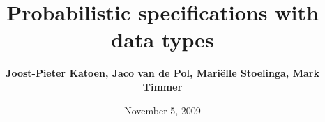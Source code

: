 \documentclass{beamer}
\title[]{\Huge Probabilistic specifications with data types}
\author[]{\LARGE \textbf{Joost-Pieter Katoen, Jaco van de Pol, Mari\"elle Stoelinga, Mark Timmer}}
\institute{\Large \vfill {Formal Methods and Tools -- Department of Computer Science -- University of Twente} }
\date{November 5, 2009}
\begin{document}
  \begin{frame}{}

\vspace{-1cm}
\begin{columns}[t]
\begin{column}{.02\linewidth}\end{column}
\begin{column}{.97\linewidth}\end{column}
\begin{column}{.02\linewidth}\end{column}
\end{columns}

\linewidth

\begin{columns}[t]
\begin{column}{.02\linewidth}\end{column}
\begin{column}{.475\linewidth}\end{column}
\begin{column}{.01\linewidth}\end{column}
\begin{column}{.475\linewidth}\end{column}
\begin{column}{.02\linewidth}\end{column}
\end{columns}

{}\linewidth

\begin{columns}[t]
\begin{column}{.02\linewidth}\end{column}
\begin{column}{.475\linewidth}\end{column}
\begin{column}{.01\linewidth}\end{column}
\begin{column}{0.475\linewidth}\end{column}
\begin{column}{.02\linewidth}\end{column}
\end{columns}

\linewidth

\begin{columns}[t]
\begin{column}{.02\linewidth}\end{column}
\begin{column}{.475\linewidth}\end{column}
\begin{column}{.01\linewidth}\end{column}
\begin{column}{0.475\linewidth}\end{column}
\begin{column}{.02\linewidth}\end{column}
\end{columns}


\end{frame}
\end{document}
